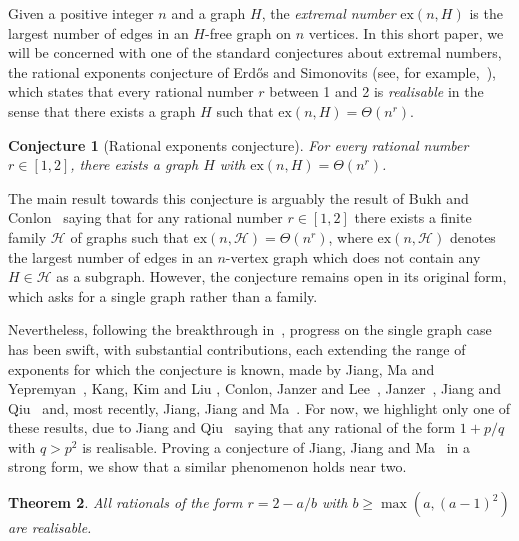 \documentclass[11pt]{article}
\numberwithin{equation}{section}
\newtheorem{theorem}{\bf Theorem}[section]
\newtheorem{conjecture}[theorem]{\bf Conjecture}
\theoremstyle{definition}
\def\ex{\mathrm{ex}}
\begin{document}
Given a positive integer $n$ and a graph $H$, the {\it extremal number} $\ex(n,H)$ is the largest number of edges in an $H$-free graph on $n$ vertices. In this short paper, we will be concerned with one of the standard conjectures about extremal numbers, the rational exponents conjecture of Erd\H{o}s and Simonovits (see, for example,~\cite{E81}), which states that every rational number $r$ between 1 and 2 is {\it realisable} in the sense that there exists a graph $H$ such that $\ex(n,H)=\Theta(n^r)$.

\begin{conjecture}[Rational exponents conjecture] \label{con:rational}
	For every rational number $r\in [1,2]$, there exists a graph $H$ with $\ex(n,H)=\Theta(n^r)$.
\end{conjecture}

The main result towards this conjecture is arguably the result of Bukh and Conlon~\cite{BC18} saying that for any rational number $r\in [1,2]$ there exists a finite family $\mathcal{H}$ of graphs such that $\ex(n,\mathcal{H})=\Theta(n^r)$, where $\ex(n,\mathcal{H})$ denotes the largest number of edges in an $n$-vertex graph which does not contain any $H\in \mathcal{H}$ as a subgraph. However, the conjecture remains open in its original form, which asks for a single graph rather than a family.

Nevertheless, following the breakthrough in~\cite{BC18}, progress on the single graph case has been swift, with substantial contributions, each extending the range of exponents for which the conjecture is known, made by Jiang, Ma and Yepremyan~\cite{JMY18}, Kang, Kim and Liu \cite{KKL18}, Conlon, Janzer and Lee~\cite{CJL21}, Janzer~\cite{Jan20}, Jiang and Qiu~\cite{JQ20,JQ19} and, most recently, Jiang, Jiang and Ma~\cite{JJM20}. For now, we highlight only one of these results, due to Jiang and Qiu~\cite{JQ19} saying that any rational of the form $1 + p/q$ with $q > p^2$ is realisable. 
Proving a conjecture of Jiang, Jiang and Ma~\cite[Conjecture 11]{JJM20} in a strong form, we show that a similar phenomenon holds near two.

\begin{theorem} \label{thm:main}
All rationals of the form $r = 2 - a/b$ with $b \geq \max(a, (a-1)^2)$ are realisable.
\end{theorem}
\end{document}
